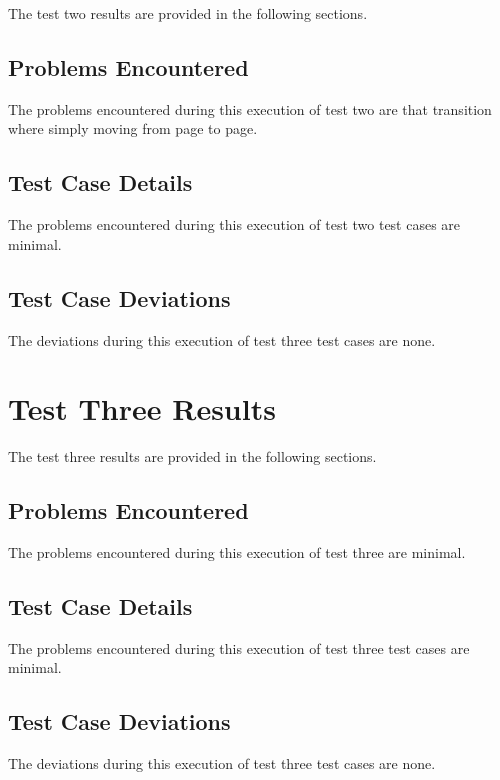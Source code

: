 The test two results are provided in the following sections.

\subsection{Problems Encountered}
\label{loc:TestTwoResultsProblems}


The problems encountered during this execution of test two are that transition where simply moving from page to page.


\subsection{Test Case Details}
\label{loc:TestTwoResultsProblems}


The problems encountered during this execution of test two test cases are minimal.


\subsection{Test Case Deviations}
\label{loc:TestTwoResultsProblems}


The deviations during this execution of test three test cases are none.


\section{Test Three Results}
\label{loc:TestThreeResults}


The test three results are provided in the following sections.

\subsection{Problems Encountered}
\label{loc:TestThreeResultsProblems}


The problems encountered during this execution of test three are minimal.


\subsection{Test Case Details}
\label{loc:TestThreeResultsProblems}


The problems encountered during this execution of test three test cases are minimal.


\subsection{Test Case Deviations}
\label{loc:TestThreeResultsProblems}


The deviations during this execution of test three test cases are none.